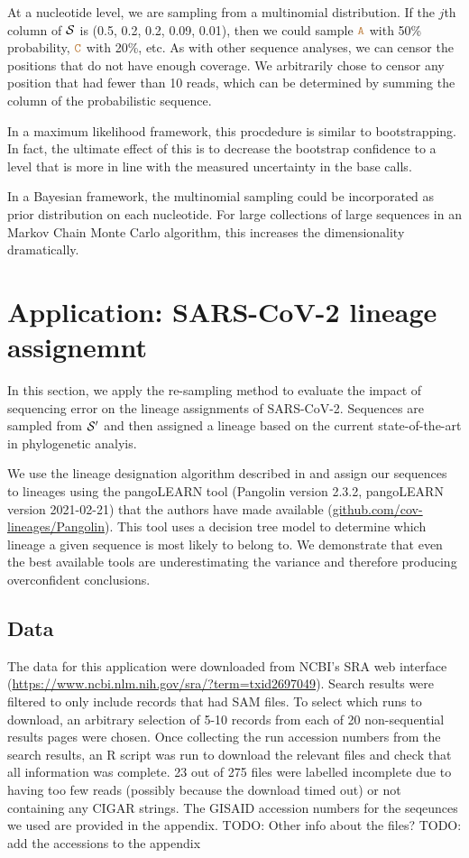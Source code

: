 \documentclass[10pt]{article}
\begin{document}
At a nucleotide level, we are sampling from a multinomial distribution.
If the $j$th column of $\mathcal{S}$ is (0.5, 0.2, 0.2, 0.09, 0.01), then we could sample $\texttt{\textcolor{brown}{A}}$ with 50\% probability, $\texttt{\textcolor{brown}{C}}$ with 20\%, etc.
As with other sequence analyses, we can censor the positions that do not have enough coverage.
We arbitrarily chose to censor any position that had fewer than 10 reads, which can be determined by summing the column of the probabilistic sequence.

In a maximum likelihood framework, this procdedure is similar to bootstrapping.
In fact, the ultimate effect of this is to decrease the bootstrap confidence to a level that is more in line with the measured uncertainty in the base calls.

In a Bayesian framework, the multinomial sampling could be incorporated as prior distribution on each nucleotide.
For large collections of large sequences in an Markov Chain Monte Carlo algorithm, this increases the dimensionality dramatically.




\section{Application: SARS-CoV-2 lineage assignemnt}

In this section, we apply the re-sampling method to evaluate the impact of sequencing error on the lineage assignments of SARS-CoV-2.
Sequences are sampled from $\mathcal{S}'$ and then assigned a lineage based on the current state-of-the-art in phylogenetic analyis.

We use the lineage designation algorithm described in \citet{rambautDynamicNomenclatureProposal2020} and assign our sequences to lineages using the pangoLEARN tool (Pangolin version 2.3.2, pangoLEARN version 2021-02-21) that the authors have made available (\url{github.com/cov-lineages/Pangolin}).
This tool uses a decision tree model to determine which lineage a given sequence is most likely to belong to.
We demonstrate that even the best available tools are underestimating the variance and therefore producing overconfident conclusions.

\subsection{Data}

The data for this application were downloaded from NCBI's SRA web interface (\url{https://www.ncbi.nlm.nih.gov/sra/?term=txid2697049}).
Search results were filtered to only include records that had SAM files.
To select which runs to download, an arbitrary selection of 5-10 records from each of 20 non-sequential results pages were chosen.
Once collecting the run accession numbers from the search results, an R script was run to download the relevant files and check that all information was complete.
23 out of 275 files were labelled incomplete due to having too few reads (possibly because the download timed out) or not containing any CIGAR strings.
The GISAID accession numbers for the seqeunces we used are provided in the appendix. TODO: Other info about the files?
TODO: add the accessions to the appendix
\end{document}

